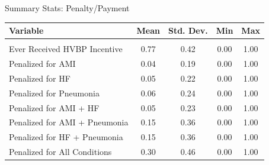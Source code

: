 \documentclass[notes,11pt, aspectratio=169]{beamer}
\begin{document}
\begin{frame}[noframenumbering]{Summary Stats: Penalty/Payment}
    \begin{table}[ht!]
\centering
\begin{tabular}[t]{lcccc}
\toprule
Variable & Mean & Std. Dev. & Min & Max\\
\midrule
\addlinespace[0.3em]
\multicolumn{5}{l}{\textbf{Penalty/Payment Variables}}\\
\hspace{1em}Ever Received HVBP Incentive & 0.77 & 0.42 & 0.00 & 1.00\\
\hspace{1em}Penalized for AMI & 0.04 & 0.19 & 0.00 & 1.00\\
\hspace{1em}Penalized for HF & 0.05 & 0.22 & 0.00 & 1.00\\
\hspace{1em}Penalized for Pneumonia & 0.06 & 0.24 & 0.00 & 1.00\\
\hspace{1em}Penalized for AMI + HF & 0.05 & 0.23 & 0.00 & 1.00\\
\hspace{1em}Penalized for AMI + Pneumonia & 0.15 & 0.36 & 0.00 & 1.00\\
\hspace{1em}Penalized for HF + Pneumonia & 0.15 & 0.36 & 0.00 & 1.00\\
\hspace{1em}Penalized for All Conditions & 0.30 & 0.46 & 0.00 & 1.00\\
\bottomrule
\end{tabular}
\end{table}
\end{frame}
\end{document}
